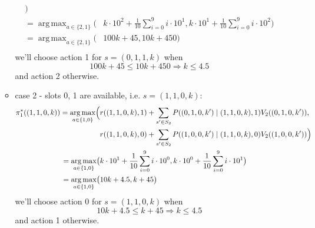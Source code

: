 \documentclass{assignmeownt}
\DeclareMathOperator*{\argmax}{arg\,max}
\begin{document}
\begin{enumerate}
\begin{itemize}
\begin{equation}
\begin{aligned}
            \Bigr) \\ 
            = \argmax_{a \in \{2,1\}} \bigl(
            &k \cdot 10^2 + \frac{1}{10} \sum_{i=0}^{9} i \cdot 10^1,
            k \cdot 10^1 + \frac{1}{10} \sum_{i=0}^{9} i \cdot 10^2
            \bigr) \\
            = \argmax_{a \in \{2,1\}} \bigl(
            &100k + 45, 10k + 450
            \bigr) \\
        \end{aligned}
    \end{equation}
    \newline
    we'll choose action 1 for $s=(0, 1, 1, k)$ when 
    \newline
    \begin{equation}
        100k + 45 \leq 10k + 450 \Rightarrow k \leq 4.5
    \end{equation}
    \newline
    and action 2 otherwise.
    \item{case 2 - slots 0, 1 are available, i.e. $s=(1, 1, 0, k)$:}
    \begin{equation}
        \begin{aligned}
            \pi^*_1((1, 1, 0, k)) = \argmax_{a \in \{1,0\}} \Bigl(
            &r((1, 1, 0, k), 1) + \sum_{s' \in S_2} P((0, 1, 0, k') \mid (1, 1, 0, k), 1) V_2((0, 1, 0, k')) , \\
            &r((1, 1, 0, k), 0) + \sum_{s' \in S_2} P((1, 0, 0, k') \mid (1, 1, 0, k), 0) V_2((1, 0, 0, k'))
            \Bigr) \\ 
            = \argmax_{a \in \{1,0\}} \bigl(
            &k \cdot 10^1 + \frac{1}{10} \sum_{i=0}^{9} i \cdot 10^0,
            k \cdot 10^0 + \frac{1}{10} \sum_{i=0}^{9} i \cdot 10^1
            \bigr) \\
            = \argmax_{a \in \{1,0\}} \bigl(
            &10k + 4.5, k + 45
            \bigr) \\
        \end{aligned}
    \end{equation}
    \newline
    we'll choose action 0 for $s=(1, 1, 0, k)$ when
    \newline
    \begin{equation}
        10k + 4.5 \leq k + 45 \Rightarrow k \leq 4.5
    \end{equation}
    \newline
    and action 1 otherwise.


\end{itemize}
\end{enumerate}
\end{document}
